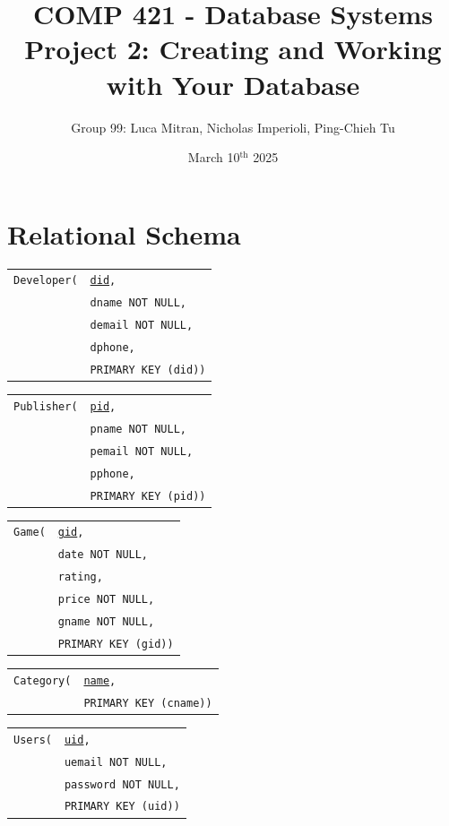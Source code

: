 \documentclass[12pt, oneside]{article}
\title{COMP 421 - Database Systems\\
        \large Project 2: Creating and Working with Your Database}
\author{Group 99: Luca Mitran, Nicholas Imperioli, Ping-Chieh Tu}
\date{March 10$^{\text{th}}$ 2025}
\begin{document}
\maketitle
\section{Relational Schema}
\begin{tabular}{l@{}l}
    \texttt{Developer(} & \texttt{\underline{did},}\\
                         & \texttt{dname NOT NULL,}\\
                         & \texttt{demail NOT NULL,}\\
                         & \texttt{dphone,}\\
                         & \texttt{PRIMARY KEY (did))}
\end{tabular}

\begin{tabular}{l@{}l}
    \texttt{Publisher(} & \texttt{\underline{pid},}\\
                         & \texttt{pname NOT NULL,}\\
                         & \texttt{pemail NOT NULL,}\\
                         & \texttt{pphone,}\\
                         & \texttt{PRIMARY KEY (pid))}
\end{tabular}

\begin{tabular}{l@{}l}
    \texttt{Game(} & \texttt{\underline{gid},}\\
                    & \texttt{date NOT NULL,}\\
                    & \texttt{rating,}\\
                    & \texttt{price NOT NULL,}\\
                    & \texttt{gname NOT NULL,}\\
                    & \texttt{PRIMARY KEY (gid))}
\end{tabular}

\begin{tabular}{l@{}l}
    \texttt{Category(} & \texttt{\underline{name},}\\
                        & \texttt{PRIMARY KEY (cname))}
\end{tabular}

\begin{tabular}{l@{}l}
    \texttt{Users(} & \texttt{\underline{uid},}\\
                     & \texttt{uemail NOT NULL,}\\
                     & \texttt{password NOT NULL,}\\
                     & \texttt{PRIMARY KEY (uid))}
\end{tabular}
\end{document}
